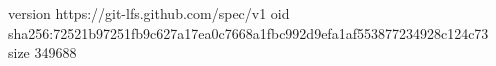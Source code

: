version https://git-lfs.github.com/spec/v1
oid sha256:72521b97251fb9c627a17ea0c7668a1fbc992d9efa1af553877234928c124c73
size 349688
